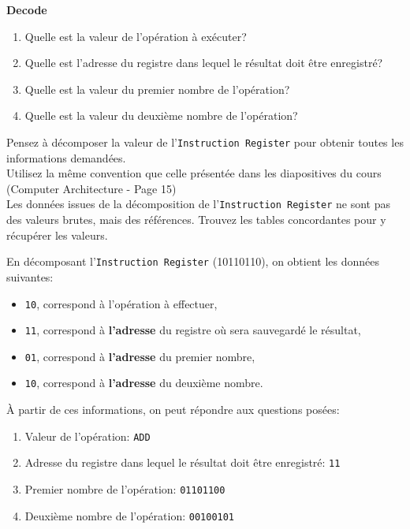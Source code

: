 \begin{Exercice}[10 minutes] \textbf{Decode}
    \begin{enumerate}
        \item Quelle est la valeur de l'opération à exécuter?
        \item Quelle est l'adresse du registre dans lequel le résultat doit être enregistré?
        \item Quelle est la valeur du premier nombre de l'opération?
        \item Quelle est la valeur du deuxième nombre de l'opération?
    \end{enumerate}

    \begin{conseil}
        Pensez à décomposer la valeur de l'\lstinline{Instruction Register} pour obtenir toutes les informations demandées. \\
        Utilisez la même convention que celle présentée dans les diapositives du cours (Computer Architecture - Page 15) \\
        Les données issues de la décomposition de l'\lstinline{Instruction Register} ne sont pas des valeurs brutes, mais des références. Trouvez les tables concordantes pour y récupérer les valeurs.
    \end{conseil}

    \begin{solution}
        En décomposant l'\lstinline{Instruction Register} (10110110), on obtient les données suivantes:
        \begin{itemize}
            \item \lstinline{10}, correspond à l'opération à effectuer,
            \item \lstinline{11}, correspond à \textbf{l'adresse} du registre où sera sauvegardé le résultat,
            \item \lstinline{01}, correspond à \textbf{l'adresse} du premier nombre,
            \item \lstinline{10}, correspond à \textbf{l'adresse} du deuxième nombre.\\
        \end{itemize}
        
    À partir de ces informations, on peut répondre aux questions posées:
       \begin{enumerate}
           \item Valeur de l'opération: \lstinline{ADD}
           \item Adresse du registre dans lequel le résultat doit être enregistré: \lstinline{11}
           \item Premier nombre de l'opération: \lstinline{01101100}
           \item Deuxième nombre de l'opération: \lstinline{00100101}
       \end{enumerate}
    \end{solution}
\end{Exercice}

